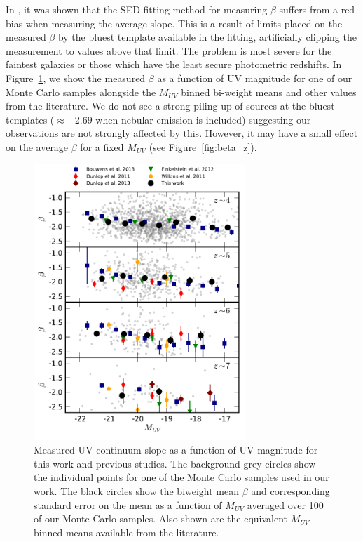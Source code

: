 In \citet{2013MNRAS.429.2456R}, it was shown that the SED fitting method for measuring $\beta$ suffers from a red bias when measuring the average slope. This is a result of limits placed on the measured $\beta$ by the bluest template available in the fitting, artificially clipping the measurement to values above that limit. The problem is most severe for the faintest galaxies or those which have the least secure photometric redshifts. In Figure~\ref{fig:beta_muv}, we show the measured $\beta$ as a function of UV magnitude for one of our Monte Carlo samples alongside the $M_{UV}$ binned bi-weight means and other values from the literature. We do not see a strong piling up of sources at the bluest templates ($\approx -2.69$ when nebular emission is included) suggesting our observations are not strongly affected by this. However, it may have a small effect on the average $\beta$ for a fixed $M_{UV}$ (see Figure~\ref{fig:beta_z}).

\begin{figure}
\centering
\includegraphics[width=80mm]{plots/figB2.pdf}
\caption[Short caption]{Measured UV continuum slope as a function of UV magnitude for this work and previous studies. The background grey circles show the individual points for one of the Monte Carlo samples used in our work. The black circles show the biweight mean $\beta$ and corresponding standard error on the mean as a function of $M_{UV}$ averaged over 100 of our Monte Carlo samples. Also shown are the equivalent $M_{UV}$ binned means available from the literature.}
\label{fig:beta_muv}
\end{figure}

